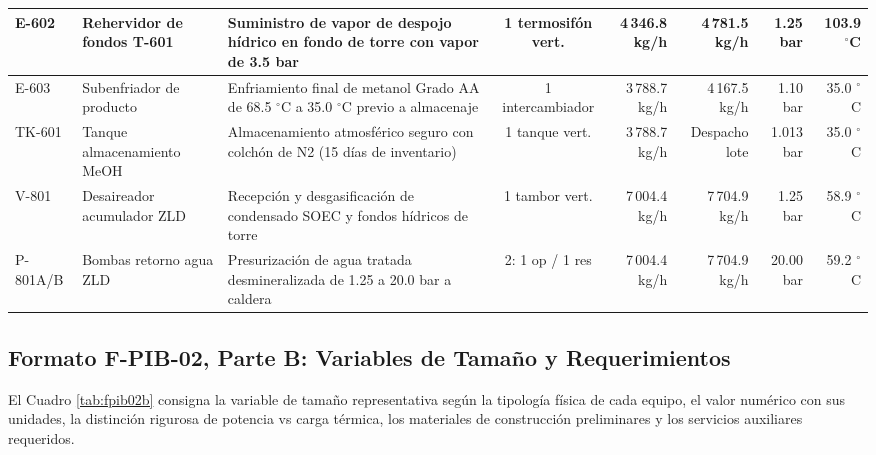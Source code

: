 \documentclass[10pt,letterpaper]{article}
\begin{document}
\begin{landscape}
\begin{xltabular}{\linewidth}{|l|p{2.6cm}|p{5.5cm}|c|r|r|r|r|}
E-602 & Rehervidor de fondos T-601 & Suministro de vapor de despojo hídrico en fondo de torre con vapor de 3.5 bar & 1 termosifón vert. & 4\,346.8 kg/h & 4\,781.5 kg/h & 1.25 bar & 103.9 $^\circ$C \\ \hline
E-603 & Subenfriador de producto & Enfriamiento final de metanol Grado AA de 68.5 $^\circ$C a 35.0 $^\circ$C previo a almacenaje & 1 intercambiador & 3\,788.7 kg/h & 4\,167.5 kg/h & 1.10 bar & 35.0 $^\circ$C \\ \hline
TK-601 & Tanque almacenamiento MeOH & Almacenamiento atmosférico seguro con colchón de N2 (15 días de inventario) & 1 tanque vert. & 3\,788.7 kg/h & Despacho lote & 1.013 bar & 35.0 $^\circ$C \\ \hline
V-801 & Desaireador acumulador ZLD & Recepción y desgasificación de condensado SOEC y fondos hídricos de torre & 1 tambor vert. & 7\,004.4 kg/h & 7\,704.9 kg/h & 1.25 bar & 58.9 $^\circ$C \\ \hline
P-801A/B & Bombas retorno agua ZLD & Presurización de agua tratada desmineralizada de 1.25 a 20.0 bar a caldera & 2: 1 op / 1 res & 7\,004.4 kg/h & 7\,704.9 kg/h & 20.00 bar & 59.2 $^\circ$C \\ \hline
\end{xltabular}
\end{landscape}

\newpage
\subsection{Formato F-PIB-02, Parte B: Variables de Tamaño y Requerimientos}
El Cuadro \ref{tab:fpib02b} consigna la variable de tamaño representativa según la tipología física de cada equipo, el valor numérico con sus unidades, la distinción rigurosa de potencia vs carga térmica, los materiales de construcción preliminares y los servicios auxiliares requeridos.
\end{document}
